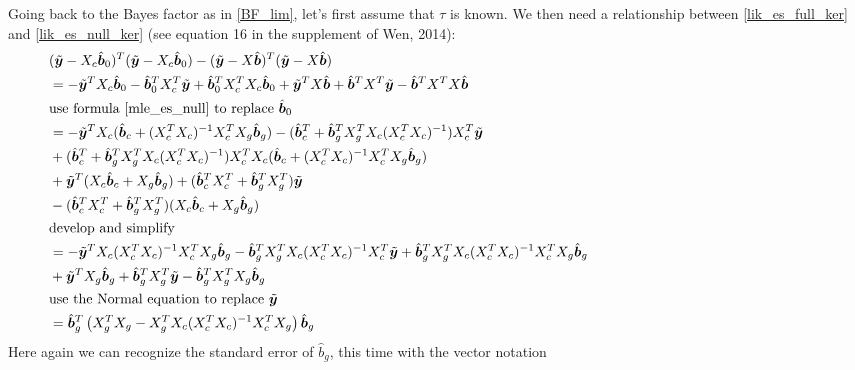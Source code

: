 \documentclass[10pt]{article}
\begin{document}
Going back to the Bayes factor as in \eqref{BF_lim}, let's first assume that $\tau$ is known.
We then need a relationship between \eqref{lik_es_full_ker} and \eqref{lik_es_null_ker} (see equation 16 in the supplement of Wen, 2014):
\begin{equation}
  \begin{aligned}
    & (\tilde{\bm{y}} -X_c \hat{\bm{b}}_0)^T (\tilde{\bm{y}} -X_c \hat{\bm{b}}_0) - (\tilde{\bm{y}} -X \hat{\bm{b}})^T (\tilde{\bm{y}} -X \hat{\bm{b}}) \\
    & = - \tilde{\bm{y}}^T X_c \hat{\bm{b}}_0 - \hat{\bm{b}}_0^T X_c^T \tilde{\bm{y}} + \hat{\bm{b}}_0^T X_c^T X_c \hat{\bm{b}}_0 + \tilde{\bm{y}}^T X \hat{\bm{b}} + \hat{\bm{b}}^T X^T \tilde{\bm{y}} - \hat{\bm{b}}^T X^T X \hat{\bm{b}} \\
    & \text{use formula \eqref{mle_es_null} to replace }\hat{\bm{b}}_0 \\
    & = - \tilde{\bm{y}}^T X_c (\hat{\bm{b}}_c + (X_c^T X_c)^{-1} X_c^T X_g \hat{\bm{b}}_g) - (\hat{\bm{b}}_c^T + \hat{\bm{b}}_g^T X_g^T X_c (X_c^T X_c)^{-1}) X_c^T \tilde{\bm{y}} \\
    & + (\hat{\bm{b}}_c^T + \hat{\bm{b}}_g^T X_g^T X_c (X_c^T X_c)^{-1}) X_c^T X_c (\hat{\bm{b}}_c + (X_c^T X_c)^{-1} X_c^T X_g \hat{\bm{b}}_g) \\
    & + \tilde{\bm{y}}^T (X_c \hat{\bm{b}}_c + X_g \hat{\bm{b}}_g) + (\hat{\bm{b}}_c^T X_c^T + \hat{\bm{b}}_g^T X_g^T) \tilde{\bm{y}} \\
    & - (\hat{\bm{b}}_c^T X_c^T + \hat{\bm{b}}_g^T X_g^T) (X_c \hat{\bm{b}}_c + X_g \hat{\bm{b}}_g) \\
    & \text{develop and simplify} \\
    & = - \tilde{\bm{y}}^T X_c (X_c^T X_c)^{-1} X_c^T X_g \hat{\bm{b}}_g - \hat{\bm{b}}_g^T X_g^T X_c (X_c^T X_c)^{-1} X_c^T \tilde{\bm{y}} + \hat{\bm{b}}_g^T X_g^T X_c (X_c^T X_c)^{-1} X_c^T X_g \hat{\bm{b}}_g \\
    & + \tilde{\bm{y}}^T X_g \hat{\bm{b}}_g + \hat{\bm{b}}_g^T X_g^T \tilde{\bm{y}} - \hat{\bm{b}}_g^T X_g^T X_g \hat{\bm{b}}_g \\
    & \text{use the Normal equation to replace $\tilde{\bm{y}}$} \\
    & = \hat{\bm{b}}_g^T \left( X_g^T X_g - X_g^T X_c (X_c^T X_c)^{-1} X_c^T X_g \right) \hat{\bm{b}}_g \\
  \end{aligned}
  \phantom{\hspace{6cm}}
\end{equation}
Here again we can recognize the standard error of $\hat{b}_g$, this time with the vector notation
\end{document}
